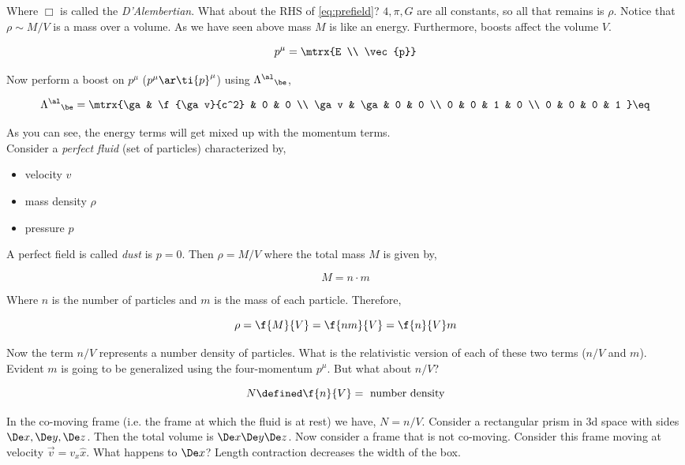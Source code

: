 \documentclass{article}
\begin{document}
Where $\Box$ is called the \textit{D'Alembertian}. What about the RHS of \eqref{eq:prefield}? $4,\pi,G$ are all constants, so all that remains is $\rho$. Notice that $\rho \sim M / V$ is a mass over a volume. As we have seen above mass $M$ is like an energy. Furthermore, boosts affect the volume $V$.

\[ p^\mu= \mtrx{E \\ \vec{p}} \]

Now perform a boost on $p^\mu$ ($p^\mu \ar \ti{p}^\mu$) using ${\Lam^{\al}}_\be$,

\[ {\Lam^{\al}}_\be = \mtrx{\ga & \f{\ga v}{c^2} & 0 & 0 \\ \ga v & \ga & 0 & 0  \\ 0 & 0 & 1 & 0  \\ 0 & 0 & 0 & 1 } \eq \label{eq:boost} \]

As you can see, the energy terms will get mixed up with the momentum terms. \\

Consider a \textit{perfect fluid} (set of particles) characterized by,
\begin{itemize}
    \item velocity $v$
    \item mass density $\rho$
    \item pressure $p$
\end{itemize}

A perfect field is called \textit{dust} is $p = 0$. Then $\rho = M/V$ where the total mass $M$ is given by,

\[ M = n \cdot m \]

Where $n$ is the number of particles and $m$ is the mass of each particle. Therefore,

\[ \rho = \f{M}{V} = \f{nm}{V} = \f{n}{V} m \]

Now the term $n/V$ represents a number density of particles. What is the relativistic version of each of these two terms ($n/V$ and $m$). Evident $m$ is going to be generalized using the four-momentum $p^\mu$. But what about $n/V$?

\[ N \defined \f{n}{V} = \text{ number density} \]

In the co-moving frame (i.e. the frame at which the fluid is at rest) we have, $N = n/V$. Consider a rectangular prism in 3d space with sides $\De x, \De y, \De z$. Then the total volume is $\De x\De y\De z$. Now consider a frame that is not co-moving. Consider this frame moving at velocity $\vec{v} = v_x \hat{x}$. What happens to $\De x$? Length contraction decreases the width of the box.
\end{document}
